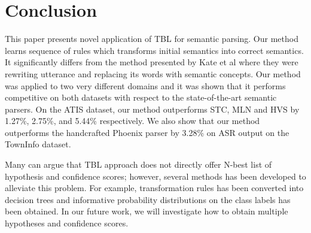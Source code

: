 \documentclass{article}
\begin{document}
\section{Conclusion} \label{sec:conlusion}

This paper presents novel application of TBL for semantic parsing. Our method learns sequence of rules which transforms initial semantics into correct semantics. It significantly differs from the method presented by Kate et al \cite{kate05} where they were rewriting utterance and replacing its words with semantic concepts. 
Our method was applied to two very different domains and it was shown that it performs competitive on both datasets with respect to the state-of-the-art semantic parsers. 
On the ATIS dataset, our method outperforms STC, MLN and HVS by 1.27\%, 2.75\%, and 5.44\% respectively. We also show that our method outperforms the handcrafted Phoenix parser by 3.28\% on ASR output on the TownInfo dataset.

Many can argue that TBL approach does not directly offer N-best list of hypothesis and confidence scores; however, several methods has been developed to alleviate this problem. For example, transformation rules has been converted into decision trees \cite{florian00} and informative probability distributions on the class labels has been obtained. In our future work, we will investigate how to obtain multiple hypotheses and confidence scores.


\eightpt


\end{document}
